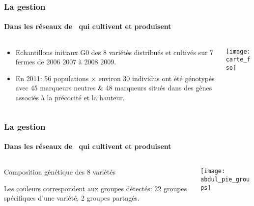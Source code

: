 \begin{frame}
\frametitle{La gestion \insitu}
\framesubtitle{Dans les réseaux de \MSPs~qui cultivent et produisent}

\begin{columns}

\begin{column}{.5\textwidth}
\begin{itemize}
\item Echantillons initiaux G0 des 8 variétés distribués et cultivés sur 7 fermes de 2006 2007 à 2008	2009. 
\item En 2011: 56 populations $\times$ environ 30 individus ont été génotypés avec 45 marqueurs neutres \& 48 marqueurs situés dans des gènes associés à la précocité et la hauteur. 
\end{itemize}
\end{column}


\begin{column}{.5\textwidth}
\begin{center}
\texttt{[image: carte\_fso]}
\end{center}
\end{column}

\end{columns}

\end{frame}


\begin{frame}
\frametitle{La gestion \insitu}
\framesubtitle{Dans les réseaux de \MSPs~qui cultivent et produisent}

\begin{columns}

\begin{column}{.4\textwidth}
Composition génétique des 8 variétés

Les couleurs correspondent aux groupes détectés:
22 groupes spécifiques d’une variété, 2 groupes partagés.
\end{column}

\begin{column}{.6\textwidth}
\begin{center}
\texttt{[image: abdul\_pie\_groups]}
\end{center}
\end{column}

\end{columns}

\end{frame}




